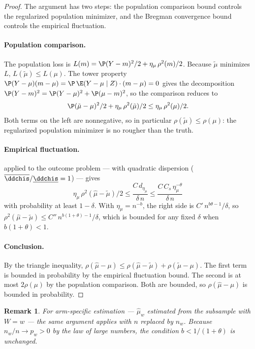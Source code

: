 \documentclass{article}
\newtheorem{remark}{Remark}[section]
\begin{document}
\begin{proof}
The argument has two steps:
the population comparison bound
controls the regularized population minimizer,
and the Bregman convergence bound
controls the empirical fluctuation.

\paragraph{Population comparison.}
The population loss is
$L(m) = \P(Y - m)^2/2
  + \eta_\mu\,\rho^2(m)/2$.
Because $\tilde\mu$ minimizes $L$,
$L(\tilde\mu) \le L(\mu)$.
The tower property
$\P(Y - \mu)(m - \mu)
  = \P\,\E(Y - \mu \mid Z)\cdot(m - \mu)
  = 0$
gives the decomposition
$\P(Y - m)^2
  = \P(Y - \mu)^2 + \P(\mu - m)^2$,
so the comparison reduces to
\[
\P(\tilde\mu - \mu)^2/2
  + \eta_\mu\,\rho^2(\tilde\mu)/2
  \le \eta_\mu\,\rho^2(\mu)/2.
\]
Both terms on the left are nonnegative,
so in particular
$\rho(\tilde\mu) \le \rho(\mu)$:
the regularized population minimizer
is no rougher than the truth.

\paragraph{Empirical fluctuation.}
applied to the outcome problem
--- with quadratic dispersion
($\overline{\ddchis}/\underline{\ddchis} = 1$) ---
gives
\[
\eta_\mu\,\rho^2(\hat\mu - \tilde\mu)/2
  \le \frac{C\, d_{\eta_\mu}}{\delta\, n}
  \le \frac{C\, C_s\, \eta_\mu^{-\theta}}
       {\delta\, n}
\]
with probability at least $1 - \delta$.
With $\eta_\mu = n^{-b}$, the right side is
$C'\,n^{b\theta - 1}/\delta$,
so
$\rho^2(\hat\mu - \tilde\mu)
  \le C''\,n^{b(1+\theta) - 1}/\delta$,
which is bounded for any fixed $\delta$
when $b(1+\theta) < 1$.

\paragraph{Conclusion.}
By the triangle inequality,
$\rho(\hat\mu - \mu)
  \le \rho(\hat\mu - \tilde\mu)
    + \rho(\tilde\mu - \mu)$.
The first term is bounded in probability
by the empirical fluctuation bound.
The second is at most $2\rho(\mu)$
by the population comparison.
Both are bounded,
so $\rho(\hat\mu - \mu)$
is bounded in probability.
\end{proof}

\begin{remark}
\label{rem:arm-specific-outcome}
For arm-specific estimation ---
$\hat\mu_w$ estimated from
the subsample with $W = w$ ---
the same argument applies with
$n$ replaced by $n_w$.
Because $n_w/n \to p_w > 0$
by the law of large numbers,
the condition
$b < 1/(1+\theta)$
is unchanged.
\end{remark}
\end{document}
